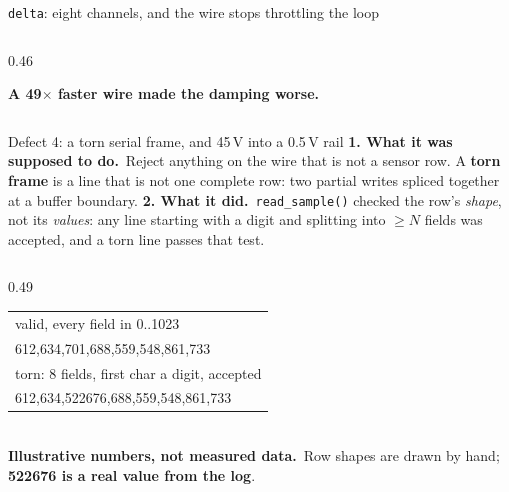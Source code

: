 \documentclass[aspectratio=169]{beamer}
\newcommand{\intended}{\textbf{1. What it was supposed to do.}}
\newcommand{\actual}{\textbf{2. What it did.}}
\newcommand{\toy}{\textbf{Illustrative numbers, not measured data.}}
\begin{document}
\begin{frame}{\texttt{delta}: eight channels, and the wire stops throttling the loop}
\begin{columns}[T]
\begin{column}{0.46\textwidth}
      \vspace{1.5mm}
      \raggedright
      \alert{\textbf{A 49$\times$ faster wire made the damping worse.}}
    \end{column}
  \end{columns}
\end{frame}

\begin{frame}{Defect 4: a torn serial frame, and 45\,V into a 0.5\,V rail}
  \footnotesize
  \intended\ Reject anything on the wire that is not a sensor row. A
  \textbf{torn frame} is a line that is not one complete row: two partial writes
  spliced together at a buffer boundary.
  \actual\ \texttt{read\_sample()} checked the row's \emph{shape}, not its
  \emph{values}: any line starting with a digit and splitting into $\geq N$
  fields was accepted, and a torn line passes that test.

  \vspace{1mm}
  \begin{columns}[T]
    \begin{column}{0.49\textwidth}
      \centering
      {\scriptsize\ttfamily
      \begin{tabular}{@{}l@{}}
        \toprule
        \rm valid, every field in 0..1023 \\
        612,634,701,688,559,548,861,733 \\
        \midrule
        \rm torn: 8 fields, first char a digit, \rm accepted \\
        612,634,522676,688,559,548,861,733 \\
        \bottomrule
      \end{tabular}}\\[1mm]
      {\scriptsize \toy\ Row shapes are drawn by hand; \textbf{522676 is a real
      value from the log}.}


\end{column}
\end{columns}
\end{frame}
\end{document}
